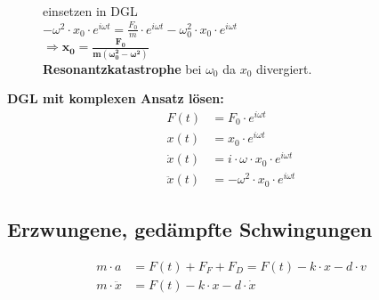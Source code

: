 \begin{samepage}
    \begin{figure}
        einsetzen in DGL\\
        $-\omega^2\cdot x_0\cdot e^{i\omega t} = \frac{F_0}{m}\cdot e^{i\omega t} - \omega_0^2 \cdot x_0 \cdot e^{i\omega t}$\\

        $\bm{\Rightarrow x_0=\frac{F_0}{m(\omega_0^2-\omega^2)}}$\\

        \textbf{Resonantzkatastrophe} bei $\omega_0$ da $x_0$ divergiert.
    \end{figure}
    \textbf{DGL mit komplexen Ansatz lösen:}\\
    \begin{align*}
        F(t) &= F_0\cdot e^{i\omega t}\\
        x(t) &=x_0 \cdot e^{i\omega t}\\
        \dot{x}(t) &= i\cdot \omega \cdot x_0 \cdot e^{i\omega t}\\
        \ddot{x}(t) &= - \omega^2 \cdot x_0 \cdot e^{i\omega t}
    \end{align*}
\end{samepage}



\subsection{Erzwungene, gedämpfte Schwingungen}
\begin{align*}
    m\cdot a &= F(t) + F_F + F_D = F(t) -k\cdot x - d\cdot v\\
    m\cdot \ddot{x} &= F(t) - k\cdot x -d \cdot \dot{x}
\end{align*}


